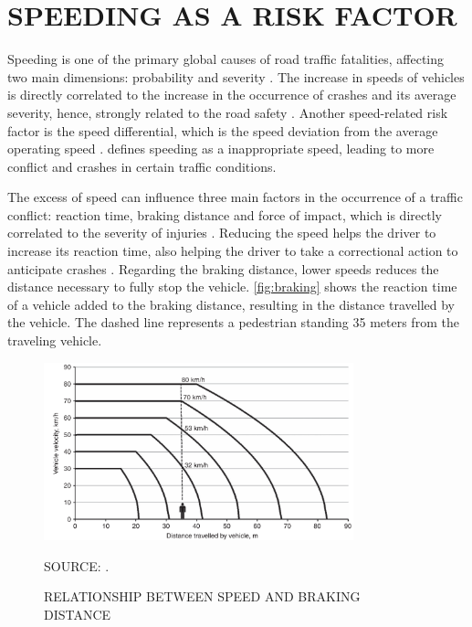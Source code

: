 \section{SPEEDING AS A RISK FACTOR} \label{speeding}



Speeding is one of the primary global causes of road traffic fatalities, affecting two main dimensions: probability and severity \cite{WHO2013}. The increase in speeds of vehicles is directly correlated to the increase in the occurrence of crashes and its average severity, hence, strongly related to the road safety \cite{Mohan2016a}. Another speed-related risk factor is the speed differential, which is the speed deviation from the average operating speed \cite{Shinar2017}. \textcite{Ferraz2012} defines speeding as a inappropriate speed, leading to more conflict and crashes in certain traffic conditions. 





The excess of speed can influence three main factors in the occurrence of a traffic conflict: reaction time, braking distance and force of impact, which is directly correlated to the severity of injuries \cite{Mohan2016a}. Reducing the speed helps the driver to increase its reaction time, also helping the driver to take a correctional action to anticipate crashes \cite{Elvik2009}. Regarding the braking distance, lower speeds reduces the distance necessary to fully stop the vehicle. \autoref{fig:braking} shows the reaction time of a vehicle added to the braking distance, resulting in the distance travelled by the vehicle. The dashed line represents a pedestrian standing 35 meters from the traveling vehicle. 

\begin{figure}[!htbp]
    \centering\footnotesize
    \captionsetup{font=footnotesize}
    \caption{RELATIONSHIP BETWEEN SPEED AND BRAKING DISTANCE}
    \includegraphics[width=0.8\textwidth]{fig/braking2.png}
    \label{fig:braking}
    \par SOURCE: \textcite{Mohan2016a}.
\end{figure} 

